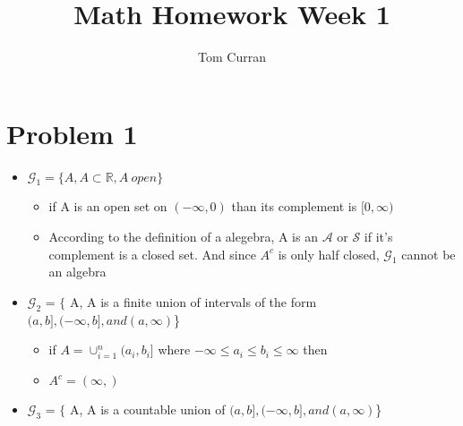 \documentclass{article}
\title{Math Homework Week 1}
\author{Tom Curran}
\theoremstyle{definition}
\begin{document}
\maketitle{}
\section{Problem 1}

\begin{itemize}

\item$\mathcal{G}_1 = \{A, A \subset \mathbb{R}, A \ open \}$

\begin{itemize}
\item if A is an open set on $(-\infty, 0)$ than its complement is $[0, \infty)$
\item According to the definition of a alegebra, A is an $\mathcal{A}$ or $\mathcal{S}$ if it's complement is a closed set. And since $A^c$ is only half closed, $\mathcal{G}_1$ cannot be an algebra
\end{itemize}

\item$\mathcal{G}_2$ = $\{$ A, A is a finite union of intervals of the form $(a,b], (-\infty, b], and (a,\infty) $\}

\begin{itemize}
  \item if $A = \cup_{i=1}^n (a_i, b_i] $ where $-\infty \leq a_i \leq b_i \leq \infty$ then
  \item $A^c = (\infty, )$
\end{itemize}
\item$\mathcal{G}_3$ = $\{$ A, A is a countable union of $(a,b], (-\infty, b], and (a,\infty) $\}

\end{itemize}
\end{document}
